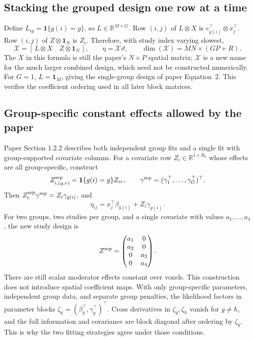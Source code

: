 \documentclass[11pt,a4paper]{article}
\newcommand{\R}{\mathbb R}
\numberwithin{equation}{section}
\begin{document}
\subsection{Stacking the grouped design one row at a time}
Define $L_{ig}=\mathbf1\{g(i)=g\}$, so $L\in\R^{M\times G}$.
Row $(i,j)$ of $L\otimes X$ is $e_{g(i)}^\top\otimes x_j^\top$.
Row $(i,j)$ of $Z\otimes\mathbf1_N$ is $Z_i$.
Therefore, with study index varying slowest,
\begin{equation}
 \mathcal X=[\,L\otimes X\quad Z\otimes\mathbf1_N\,],
 \qquad \eta=\mathcal X\vartheta,\qquad
 \dim(\mathcal X)=MN\times(GP+R).
\end{equation}
The $X$ in this formula is still the paper's $N\times P$ spatial
matrix; $\mathcal X$ is a new name for the much larger combined
design, which need not be constructed numerically.
For $G=1$, $L=\mathbf1_M$, giving the single-group design of
paper Equation~2. This verifies the coefficient ordering used in
all later block matrices.

\subsection{Group-specific constant effects allowed by the paper}
Paper Section 1.2.2 describes both independent group fits and a
single fit with group-supported covariate columns.
For a covariate row $Z_i\in\R^{1\times R_0}$ whose effects are all
group-specific, construct
\[
 Z^{\rm sep}_{i,(g,r)}
   =\mathbf1\{g(i)=g\}Z_{ir},\qquad
 \gamma^{\rm sep}=(\gamma_1^\top,\ldots,\gamma_G^\top)^\top.
\]
Then $Z_i^{\rm sep}\gamma^{\rm sep}=Z_i\gamma_{g(i)}$, and
\[
 \eta_{ij}=x_j^\top\beta_{g(i)}+Z_i\gamma_{g(i)}.
\]
For two groups, two studies per group, and a single covariate with
values $a_1,\ldots,a_4$, the new study design is
\[
 Z^{\rm sep}=
 \begin{pmatrix}a_1&0\\a_2&0\\0&a_3\\0&a_4\end{pmatrix}.
\]
There are still scalar moderator effects constant over voxels.
This construction does not introduce spatial coefficient maps.
With only group-specific parameters, independent group data, and
separate group penalties, the likelihood factors in parameter
blocks $\zeta_g=(\beta_g^\top,\gamma_g^\top)^\top$.
Cross derivatives in $\zeta_g,\zeta_h$ vanish for $g\ne h$, and
the full information and covariance are block diagonal after
ordering by $\zeta_g$. This is why the two fitting strategies agree
under those conditions.
\end{document}
